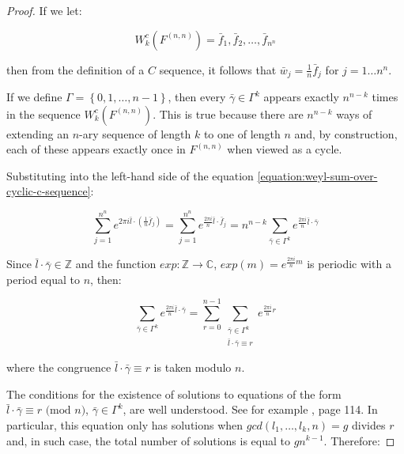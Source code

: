 \documentclass[11pt,a4paper]{tesis}
\theoremstyle{plain}
\theoremstyle{definition}
\begin{document}
\begin{proof}
  If we let:

  \begin{equation*}
    W_k^c\left(F^{(n, n)}\right) = \bar{f}_1, \bar{f}_2, \dots, \bar{f}_{n^n}
  \end{equation*}

  then from the definition of a $C$ sequence, it follows that $\bar{w}_j = \frac{1}{n} \bar{f}_j$ for $j = 1 \dots n^n$.
  
  If we define $\Gamma = \left \{ 0, 1, \dots, n - 1 \right \} $, then every $\bar{\gamma} \in \Gamma^k$ appears exactly $n^{n - k}$ times in the sequence $W_k^c\left(F^{(n, n)}\right)$. This is true because there are  $n^{n - k}$ ways of extending an $n$-ary sequence of length $k$ to one of length $n$ and, by construction, each of these appears exactly once in $F^{(n, n)}$ when viewed as a cycle.
  
  Substituting into the left-hand side of the equation \ref{equation:weyl-sum-over-cyclic-c-sequence}:
  
  \begin{equation*}
    \sum_{j = 1}^{n^n} e^{2 \pi i \bar{l} \cdot (\frac{1}{n} \bar{f}_j)} = \sum_{j = 1}^{n^n} e^{\frac{2 \pi i}{n} \bar{l} \cdot \bar{f}_j} = n^{n - k} \sum_{\bar{\gamma} \in \Gamma^k} e^{\frac{2 \pi i}{n} \bar{l} \cdot \bar{\gamma}}
  \end{equation*}

  Since $\bar{l} \cdot \bar{\gamma} \in \mathbb{Z}$ and the function $exp : \mathbb{Z} \to \mathbb{C}$, $exp(m) = e^{\frac{2 \pi i}{n} m}$ is periodic with a period equal to $n$, then:

  \begin{equation*}
    \sum_{\bar{\gamma} \in \Gamma^k} e^{\frac{2 \pi i}{n} \bar{l} \cdot \bar{\gamma}}
    = \sum_{r = 0}^{n - 1}
        \sum_{
          \substack{
            \bar{\gamma} \in \Gamma^k \\
            \bar{l} \cdot \bar{\gamma} \equiv r
          }
        } e^{\frac{2 \pi i}{n} r}
  \end{equation*}

  where the congruence $\bar{l} \cdot \bar{\gamma} \equiv r$ is taken modulo $n$.

  The conditions for the existence of solutions to equations of the form $\bar{l} \cdot \bar{\gamma} \equiv r \text{ (mod $n$)}$, $\bar{\gamma} \in \Gamma^k$, are well understood. See for example \cite{mccarthy-1986}, page 114. In particular, this equation only has solutions when $gcd(l_1, \dots, l_k, n) = g$ divides $r$ and, in such case, the total number of solutions is equal to $g n^{k - 1}$. Therefore:


\end{proof}
\end{document}
